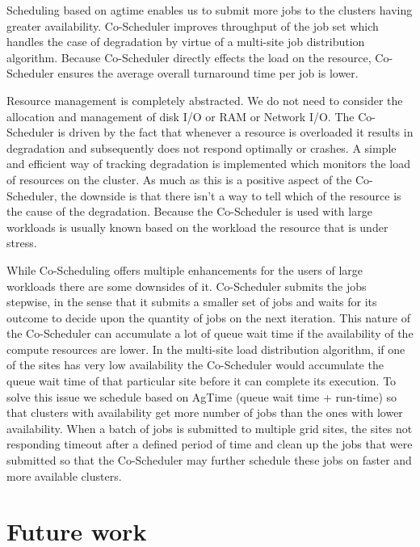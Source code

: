 \documentclass[ms,electronic,double]{nuthesis}
\begin{document}
Scheduling based on agtime enables us to submit more jobs to the clusters having greater availability. Co-Scheduler improves throughput of the job set which handles the 
case of degradation by virtue of a multi-site job distribution algorithm. Because Co-Scheduler directly effects the load on the resource, Co-Scheduler 
ensures the average overall turnaround time per job is lower.

Resource management is completely abstracted. We do not need to consider the 
allocation and management of disk I/O or RAM or Network I/O. The Co-Scheduler is 
driven by the fact that whenever a resource is overloaded it results in 
degradation and subsequently does not respond optimally or crashes. A simple and 
efficient way of tracking degradation is implemented which monitors the load of 
resources on the cluster. As much as this is a positive aspect of the 
Co-Scheduler, the downside is that there isn't a way to tell which of the resource is 
the cause of the degradation. Because the Co-Scheduler is used with large workloads is usually known based on 
the workload the resource that is under stress.

While Co-Scheduling offers multiple enhancements for the users of large workloads 
there are some downsides of it. Co-Scheduler submits the jobs stepwise, in 
the sense that it submits a smaller set of jobs and waits for its outcome to decide upon the quantity 
of jobs on the next iteration. This 
nature of the Co-Scheduler can accumulate a lot of queue wait time if the availability 
of the compute resources are lower. In the multi-site load distribution 
algorithm, if one of the sites has very low availability the Co-Scheduler would 
accumulate the queue wait time of that particular site before it can complete 
its execution. To solve this issue we schedule based on AgTime (queue wait time + run-time) so that clusters with availability 
get more number of jobs than the ones with lower availability. When a batch of 
jobs is submitted to multiple grid sites, the sites not responding timeout after 
a defined period of time and clean up the jobs that were submitted so that the Co-Scheduler may further 
schedule these jobs on faster and more available clusters. 

\section{Future work}
\end{document}
